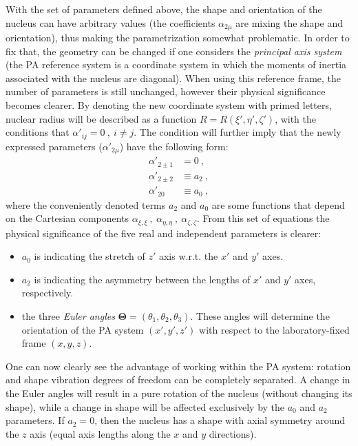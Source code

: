 With the set of parameters defined above, the shape and orientation of the nucleus can have arbitrary values (the coefficients $\alpha_{2\mu}$ are mixing the shape and orientation), thus making the parametrization somewhat problematic. In order to fix that, the geometry can be changed if one considers the \emph{principal axis system} (the PA reference system is a coordinate system in which the moments of inertia associated with the nucleus are diagonal). 
When using this reference frame, the number of parameters is still unchanged, however their physical significance becomes clearer. By denoting the new coordinate system with primed letters, nuclear radius will be described as a function $R=R(\xi',\eta',\zeta')$, with the conditions that $\alpha'_{ij}=0\ ,\ i\neq j$. The condition will further imply that the newly expressed parameters ($\alpha'_{2\mu}$) have the following form:
\begin{align}
    \alpha'_{2 \pm 1}&=0\ , \nonumber \\
    \alpha'_{2 \pm 2}&\equiv a_2\ , \nonumber \\
    \alpha'_{20}&\equiv a_0\ ,
\end{align}
where the conveniently denoted terms $a_2$ and $a_0$ are some functions that depend on the Cartesian components $\alpha_{\xi,\xi}\ ,\ \alpha_{\eta,\eta}\ ,\ \alpha_{\zeta,\zeta}$. From this set of equations the physical significance of the five real and independent parameters is clearer:
\begin{itemize}
    \item $a_0$ is indicating the stretch of $z'$ axis w.r.t. the $x'$ and $y'$ axes.
    \item $a_2$ is indicating the asymmetry between the lengths of $x'$ and $y'$ axes, respectively.
    \item the three \emph{Euler angles} $\mathbf{\Theta}=(\theta_1,\theta_2,\theta_3)$. These angles will determine the orientation of the PA system $(x',y',z')$ with respect to the laboratory-fixed frame $(x,y,z)$.
\end{itemize}

One can now clearly see the advantage of working within the PA system: rotation and shape vibration degrees of freedom can be completely separated. A change in the Euler angles will result in a pure rotation of the nucleus (without changing its shape), while a change in shape will be affected exclusively by the $a_0$ and $a_2$ parameters. If $a_2=0$, then the nucleus has a shape with axial symmetry around the $z$ axis (equal axis lengths along the $x$ and $y$ directions).

